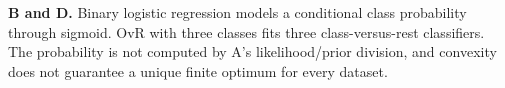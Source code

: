 \textbf{B and D.} Binary logistic regression models a conditional class probability through sigmoid. OvR with three classes fits three class-versus-rest classifiers. The probability is not computed by A's likelihood/prior division, and convexity does not guarantee a unique finite optimum for every dataset.
